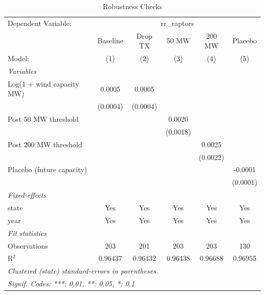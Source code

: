 \begin{table}[htbp]
\centering
\caption{Robustness Checks}
\label{tab:robustness}

\begingroup
\centering
\begin{tabular}{lccccc}
   \tabularnewline \midrule \midrule
   Dependent Variable: & \multicolumn{5}{c}{rr\_raptors}\\
                             & Baseline & Drop TX  & 50 MW    & 200 MW   & Placebo \\   
   Model:                    & (1)      & (2)      & (3)      & (4)      & (5)\\  
   \midrule
   \emph{Variables}\\
   Log(1 + wind capacity MW) & 0.0005   & 0.0005   &          &          &   \\   
                             & (0.0004) & (0.0004) &          &          &   \\   
   Post 50 MW threshold      &          &          & 0.0020   &          &   \\   
                             &          &          & (0.0018) &          &   \\   
   Post 200 MW threshold     &          &          &          & 0.0025   &   \\   
                             &          &          &          & (0.0022) &   \\   
   Placebo (future capacity) &          &          &          &          & -0.0001\\   
                             &          &          &          &          & (0.0001)\\   
   \midrule
   \emph{Fixed-effects}\\
   state                     & Yes      & Yes      & Yes      & Yes      & Yes\\  
   year                      & Yes      & Yes      & Yes      & Yes      & Yes\\  
   \midrule
   \emph{Fit statistics}\\
   Observations              & 203      & 201      & 203      & 203      & 130\\  
   R$^2$                     & 0.96437  & 0.96432  & 0.96438  & 0.96688  & 0.96955\\  
   \midrule \midrule
   \multicolumn{6}{l}{\emph{Clustered (state) standard-errors in parentheses}}\\
   \multicolumn{6}{l}{\emph{Signif. Codes: ***: 0.01, **: 0.05, *: 0.1}}\\
\end{tabular}
\par\endgroup



\end{table}
